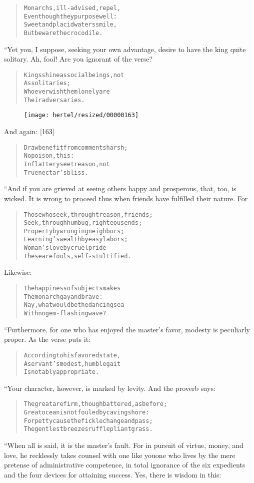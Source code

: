\documentclass[article, twoside, 10pt]{memoir}
\renewenvironment{verbatim}{%
\begin{quote}%
\vskip -10pt%
\begin{alltt}\normalfont\small}{\end{alltt}%
\end{quote}%
\vskip -10pt
} %
\begin{document}
\begin{verbatim}
Monarchs, ill-advised, repel,
Even though they purpose well:
Sweet and placid waters smile,
But beware the crocodile.
\end{verbatim}
“Yet you, I suppose, seeking your own advantage, desire to have the
king quite solitary. Ah, fool! Are you ignorant of the verse?

\begin{verbatim}
Kings shine as social beings, not
    As solitaries;
Whoever wish them lonely are
    Their adversaries.
\end{verbatim}
\begin{figure}[p]\texttt{[image: hertel/resized/00000163]}\end{figure}And again: [163]

\begin{verbatim}
Draw benefit from comments harsh;
    No poison, this:
In flattery see treason, not
    True nectar's bliss.
\end{verbatim}
“And if you are grieved at seeing others happy and prosperous,
that, too, is wicked. It is wrong to proceed thus when friends have
fulfilled their nature. For

\begin{verbatim}
Those who seek, through treason, friends;
Seek, through humbug, righteous ends;
Property by wronging neighbors;
Learning's wealth by easy labors;
Woman's love by cruel pride{\textemdash}
These are fools, self-stultified.
\end{verbatim}
Likewise:

\begin{verbatim}
The happiness of subjects makes
    The monarch gay and brave:
Nay, what would be the dancing sea
    With no gem-flashing wave?
\end{verbatim}
“Furthermore, for one who has enjoyed the master's favor, modesty
is peculiarly proper. As the verse puts it:

\begin{verbatim}
According to his favored state,
A servant's modest, humble gait
Is notably appropriate.
\end{verbatim}
“Your character, however, is marked by levity. And the proverb
says:

\begin{verbatim}
The great are firm, though battered, as before;
Great ocean is not fouled by caving shore:
For petty cause the fickle change and pass;
The gentlest breezes ruffle pliant grass.
\end{verbatim}
“When all is said, it is the master's fault. For in pursuit of
virtue, money, and love, he recklessly takes counsel with one like
you{\textemdash}one who lives by the mere pretense of administrative
competence, in total ignorance of the six expedients and the four
devices for attaining success. Yes, there is wisdom in this:
\end{document}
